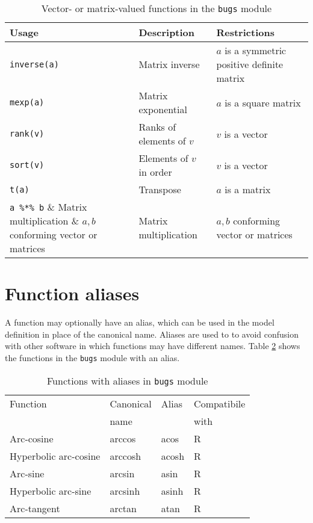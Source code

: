 \documentclass[11pt, a4paper, titlepage]{report}
\begin{document}
\begin{table}
\begin{center}
\begin{tabular}{lll}
\hline
Usage & Description & Restrictions \\
\hline
\verb+inverse(a)+ & Matrix inverse & $a$ is a symmetric positive definite matrix  \\
\verb+mexp(a)+ & Matrix exponential & $a$ is a square matrix \\
\verb+rank(v)+ & Ranks of elements of $v$ & $v$ is a vector   \\
\verb+sort(v)+ & Elements of $v$ in order & $v$ is a vector  \\
\verb+t(a)+    & Transpose                & $a$ is a matrix \\
\verb+a %*% b+  & Matrix multiplication & $a,b$ conforming vector or matrices\\

\hline
\end{tabular}
\caption{Vector- or matrix-valued functions in the \texttt{bugs}
  module \label{table:bugs:vector}}
\end{center}
\end{table}

\section{Function aliases}

A function may optionally have an alias, which can be used in the
model definition in place of the canonical name. Aliases are used to
to avoid confusion with other software in which functions may have
different names. Table \ref{table:bugs:functions:alias} shows the
functions in the \texttt{bugs} module with an alias.

\begin{table}
\begin{center}
\begin{tabular}{llll}
\hline
Function               & Canonical & Alias & Compatibile  \\
                       & name      &       & with         \\
\hline
Arc-cosine             & arccos    & acos  & R \\
Hyperbolic arc-cosine  & arccosh   & acosh & R \\
Arc-sine               & arcsin    & asin  & R \\
Hyperbolic arc-sine    & arcsinh   & asinh & R \\
Arc-tangent            & arctan    & atan  & R \\
\hline
\end{tabular}
\caption{Functions with aliases in \texttt{bugs} module
  \label{table:bugs:functions:alias}}
\end{center}
\end{table}
\end{document}
